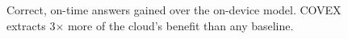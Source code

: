 \documentclass[sigconf]{acmart}
\begin{document}
\begin{figure}[t]
  \centering
  {\selectfont}
  \caption{Correct, on-time answers gained over the on-device model. COVEX extracts 3$\times$ more of the cloud's benefit than any baseline.}
  \label{fig:teaser}
\end{figure}


\end{document}

